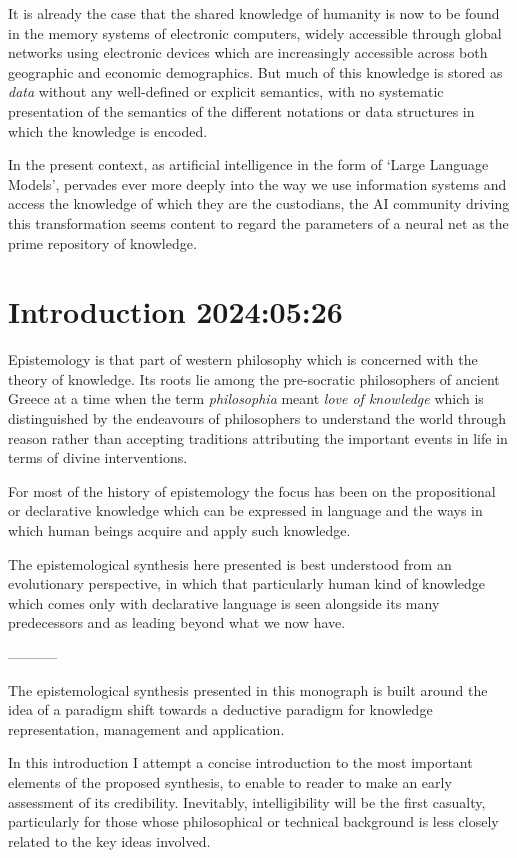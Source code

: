 \documentclass[10pt,titlepage]{book}
\begin{document}
It is already the case that the shared knowledge of humanity is now to be found in the memory systems of electronic computers, widely accessible through global networks using electronic devices which are increasingly accessible across both geographic and economic demographics.
But much of this knowledge is stored as \emph{data} without any well-defined or explicit semantics, with no systematic presentation of the semantics of the different notations or data structures in which the knowledge is encoded.

In the present context, as artificial intelligence in the form of `Large Language Models', pervades ever more deeply into the way we use information systems and access the knowledge of which they are the custodians, the AI community driving this transformation seems content to regard the parameters of a neural net as the prime repository of knowledge.



\chapter{Introduction 2024:05:26}

Epistemology is that part of western philosophy which is concerned with the theory of knowledge.
Its roots lie among the pre-socratic philosophers of ancient Greece at a time when the term \emph{philosophia} meant \emph{love of knowledge} which is distinguished by the endeavours of philosophers to understand the world through reason rather than accepting traditions attributing the important events in life in terms of divine interventions.

For most of the history of epistemology the focus has been on the propositional or declarative knowledge which can be expressed in language and the ways in which human beings acquire and apply such knowledge.


The epistemological synthesis here presented is best understood from an evolutionary perspective, in which that particularly human kind of knowledge which comes only with declarative language is seen alongside its many predecessors and as leading beyond what we now have.

-----------

The epistemological synthesis presented in this monograph is built around the idea of a paradigm shift towards a deductive paradigm for knowledge representation, management and application.

In this introduction I attempt a concise introduction to the most important elements of the proposed synthesis, to enable to reader to make an early assessment of its credibility.
Inevitably, intelligibility will be the first casualty, particularly for those whose philosophical or technical background is less closely related to the key ideas involved.
\end{document}

